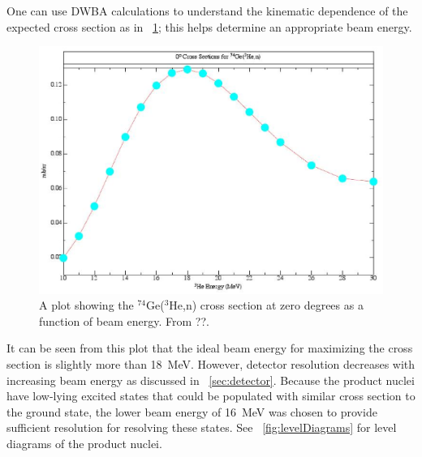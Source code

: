One can use DWBA calculations to understand the kinematic dependence of the expected cross section as in {\fig}~\ref{fig:optimizeCrossSection}; this helps determine an appropriate beam energy.  
\begin{figure}[htp]
\centering
\includegraphics[width=1.0\textwidth]{figures/74Ge_0plus_xsection.eps}
\caption{A plot showing the $^{74}$Ge($^3$He,n) \zp cross section at zero degrees as a function of beam energy.  From ??.}
\label{fig:optimizeCrossSection}
\end{figure}
It can be seen from this plot that the ideal beam energy for maximizing the \reaction cross section is slightly more than 18~MeV.  However, detector resolution decreases with increasing beam energy as discussed in {\sect}~\ref{sec:detector}.  Because the product nuclei \SeProducts have low-lying excited \tp states that could be populated with similar cross section to the ground state, the lower beam energy of 16~MeV was chosen to provide sufficient resolution for resolving these states.  See {\fig}~\ref{fig:levelDiagrams} for level diagrams of the product nuclei.
